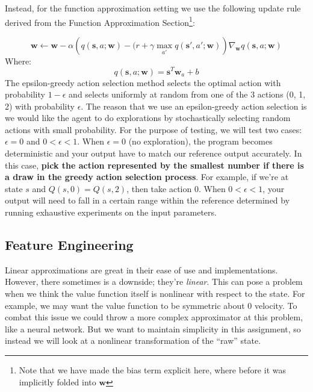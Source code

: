 \documentclass[11pt,addpoints,answers]{exam}
\newcommand{\sv}{\mathbf{s}}
\newcommand{\wv}{\mathbf{w}}
\begin{document}
Instead, for the function approximation setting we use the following update rule derived from the Function Approximation Section\footnote{Note that we have made the bias term explicit here, where before it was implicitly folded into $\wv$ }:

\[
\wv \leftarrow \wv - \alpha \left(q(\sv, a; \wv) - (r + \gamma \max_{a'} q(\sv', a'; \wv)\right) \nabla_\wv q(\sv, a; \wv)
\]
Where:
\[
q(\sv,a;\wv) = \sv^T \wv_a + b
\]
The epsilon-greedy action selection method selects the optimal action with probability $1 - \epsilon$ and selects uniformly at random from one of the 3 actions (0, 1, 2) with probability $\epsilon$. The reason that we use an epsilon-greedy action selection is we would like the agent to do explorations by stochastically selecting random actions with small probability. For the purpose of testing, we will test two cases: $\epsilon = 0$ and $0 < \epsilon < 1$. When $\epsilon = 0$ (no exploration), the program becomes deterministic and your output have to match our reference output accurately. In this case, \textbf{pick the action represented by the smallest number if there is a draw in the greedy action selection process}. For example, if we're at state $s$ and $Q(s, 0) = Q(s, 2)$, then take action $0$. When $0 < \epsilon < 1$, your output will need to fall in a certain range within the reference determined by running exhaustive experiments on the input parameters.


\subsection{Feature Engineering}
Linear approximations are great in their ease of use and implementations. However, there sometimes is a downside; they're \emph{linear}. This can pose a problem when we think the value function itself is nonlinear with respect to the state. For example, we may want the value function to be symmetric about 0 velocity. To combat this issue we could throw a more complex approximator at this problem, like a neural network. But we want to maintain simplicity in this assignment, so instead we will look at a nonlinear transformation of the ``raw'' state.
\end{document}
